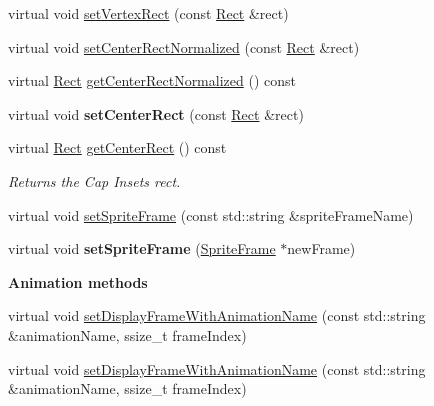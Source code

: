 \begin{Indent}
\begin{DoxyCompactItemize}
\item 
virtual void \hyperlink{classSprite_a8ce2bc7281eb971bcc6e9f2a85d82833}{set\+Vertex\+Rect} (const \hyperlink{classRect}{Rect} \&rect)
\item 
virtual void \hyperlink{classSprite_a63f00ef8a92e2aa52fec1dc288e233f2}{set\+Center\+Rect\+Normalized} (const \hyperlink{classRect}{Rect} \&rect)
\item 
virtual \hyperlink{classRect}{Rect} \hyperlink{classSprite_ad3a942ac9bc35aecc8efa6cb38fd4d5a}{get\+Center\+Rect\+Normalized} () const
\item 
\mbox{\label{classSprite_a165f6ea6be011fbe2337c59cec41d155}} 
virtual void {\bfseries set\+Center\+Rect} (const \hyperlink{classRect}{Rect} \&rect)
\item 
virtual \hyperlink{classRect}{Rect} \hyperlink{classSprite_a22609e0c2de3b6dbfcbb8df232d69a7a}{get\+Center\+Rect} () const
\begin{DoxyCompactList}\small\item\em Returns the Cap Insets rect. \end{DoxyCompactList}\item 
virtual void \hyperlink{classSprite_ab2ffaa52af7443e063146265c2982b48}{set\+Sprite\+Frame} (const std\+::string \&sprite\+Frame\+Name)
\item 
\mbox{\label{classSprite_a9a2478dda0253f85654c246539bcfb8a}} 
virtual void {\bfseries set\+Sprite\+Frame} (\hyperlink{classSpriteFrame}{Sprite\+Frame} $\ast$new\+Frame)
\end{DoxyCompactItemize}
\end{Indent}
\begin{Indent}\textbf{ Animation methods}\par
\begin{DoxyCompactItemize}
\item 
virtual void \hyperlink{classSprite_afebc449247fe0a48430e72bdb2a801e8}{set\+Display\+Frame\+With\+Animation\+Name} (const std\+::string \&animation\+Name, ssize\+\_\+t frame\+Index)
\item 
virtual void \hyperlink{classSprite_a6c97feaea8f275c0233ad8e55743b0c5}{set\+Display\+Frame\+With\+Animation\+Name} (const std\+::string \&animation\+Name, ssize\+\_\+t frame\+Index)
\end{DoxyCompactItemize}
\end{Indent}
